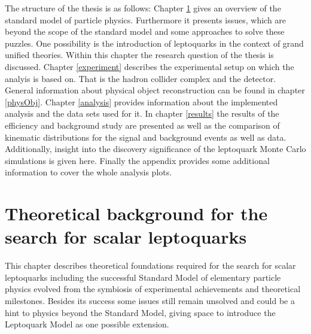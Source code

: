 The structure of the thesis is as follows: Chapter \ref{theory} gives an overview of the standard model of particle physics. Furthermore it presents issues, which are beyond the scope of the standard model and some approaches to solve these puzzles. One possibility is the introduction of leptoquarks in the context of grand unified theories. Within this chapter the research question of the thesis is discussed. Chapter \ref{experiment} describes the experimental setup on which the analyis is based on. That is the hadron collider complex {\LHC} and the {\ATLAS} detector. General information about physical object reconstruction can be found in chapter \ref{physObj}. Chapter \ref{analysis} provides information about the implemented analysis and the data sets used for it. In chapter \ref{results} the results of the efficiency and background study are presented as well as the comparison of kinematic distributions for the signal and background events as well as data. Additionally, insight into the discovery significance of the leptoquark Monte Carlo simulations is given here. Finally the appendix provides some additional information to cover the whole analysis plots. 
\chapter{Theoretical background for the search for scalar leptoquarks}\label{theory}
This chapter describes theoretical foundations required for the search for scalar leptoquarks including the successful Standard Model of elementary particle physics evolved from the symbiosis of experimental achievements and theoretical milestones. Besides its success some issues still remain unsolved and could be a hint to physics beyond the Standard Model, giving space to introduce the Leptoquark Model as one possible extension. 
